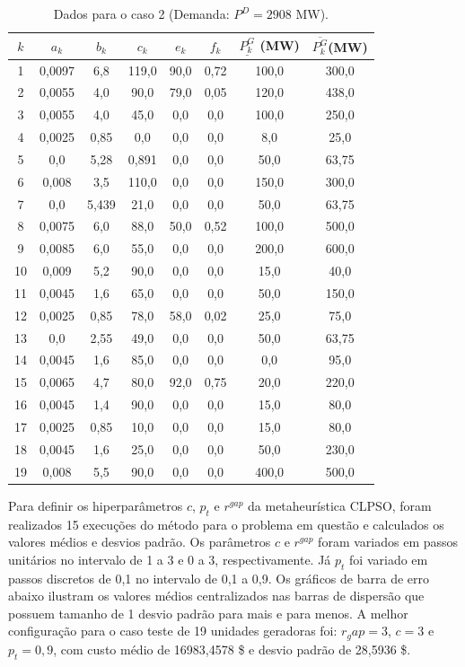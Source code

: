 \documentclass[
	12pt,				%
	openany,			%
	twoside,			%
	a4paper,			%
	chapter=TITLE,		%
	section=Title,		%
	subsection=Title,	%
	subsubsection=Title,%
	english,			%
	french,				%
	spanish,			%
	brazil			%
	]{abntex2}
\begin{document}
\begin{ERRATA}
\begin{apendicesenv}
\begin{table}[h]
\caption{\label{19coef}Dados para o caso 2 (Demanda: $P^D=2908$ MW).}
\center
\begin{tabular}{c c c c c c c c}
\hline
 $k$  & $a_k$       & $b_k$    & $c_k$     & $e_k$     & $f_k$     & $\underline{P^G_k}$ (MW)    & $\overline{P^G_k} $(MW)  \\
 \hline
1  & 0,0097 & 6,8   & 119,0 & 90,0 & 0,72 & 100,0 & 300,0 \\
2  & 0,0055 & 4,0   & 90,0  & 79,0 & 0,05 & 120,0 & 438,0 \\
3  & 0,0055 & 4,0   & 45,0  & 0,0  & 0,0  & 100,0 & 250,0 \\
4  & 0,0025 & 0,85  & 0,0   & 0,0  & 0,0  & 8,0   & 25,0  \\
5  & 0,0    & 5,28  & 0,891 & 0,0  & 0,0  & 50,0  & 63,75 \\
6  & 0,008  & 3,5   & 110,0 & 0,0  & 0,0  & 150,0 & 300,0 \\
7  & 0,0    & 5,439 & 21,0  & 0,0  & 0,0  & 50,0  & 63,75 \\
8  & 0,0075 & 6,0   & 88,0  & 50,0 & 0,52 & 100,0 & 500,0 \\
9  & 0,0085 & 6,0   & 55,0  & 0,0  & 0,0  & 200,0 & 600,0 \\
10  & 0,009  & 5,2   & 90,0  & 0,0  & 0,0  & 15,0  & 40,0  \\
11 & 0,0045 & 1,6   & 65,0  & 0,0  & 0,0  & 50,0  & 150,0 \\
12 & 0,0025 & 0,85  & 78,0  & 58,0 & 0,02 & 25,0  & 75,0  \\
13 & 0,0    & 2,55  & 49,0  & 0,0  & 0,0  & 50,0  & 63,75 \\
14 & 0,0045 & 1,6   & 85,0  & 0,0  & 0,0  & 0,0   & 95,0  \\
15 & 0,0065 & 4,7   & 80,0  & 92,0 & 0,75 & 20,0  & 220,0 \\
16 & 0,0045 & 1,4   & 90,0  & 0,0  & 0,0  & 15,0  & 80,0  \\
17 & 0,0025 & 0,85  & 10,0  & 0,0  & 0,0  & 15,0  & 80,0  \\
18 & 0,0045 & 1,6   & 25,0  & 0,0  & 0,0  & 50,0  & 230,0 \\
19 & 0,008  & 5,5   & 90,0  & 0,0  & 0,0  & 400,0 & 500,0\\
\hline
\end{tabular}
\end{table}


Para definir os hiperparâmetros $c$, $p_t$ e $r^{gap}$ da metaheurística CLPSO, foram realizados 15 execuções do método para o problema em questão e calculados os valores médios e desvios padrão. Os parâmetros $c$ e $r^{gap}$ foram variados em passos unitários no intervalo de 1 a 3 e 0 a 3, respectivamente. Já $p_t$ foi variado em passos discretos de 0,1 no intervalo de 0,1 a 0,9. Os gráficos de barra de erro abaixo ilustram os valores médios centralizados nas barras de dispersão que possuem tamanho de 1 desvio padrão para mais e para menos. A melhor configuração para o caso teste de 19 unidades geradoras foi: $r_gap=3$, $c=3$ e $p_t=0,9$, com custo médio de 16983,4578 \$ e desvio padrão de 28,5936 \$.


\end{apendicesenv}
\end{ERRATA}
\end{document}

